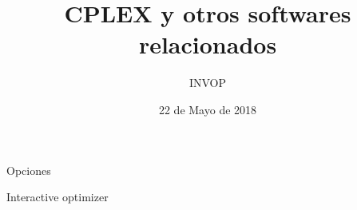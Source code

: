 \documentclass{beamer}
\title{CPLEX y otros softwares relacionados}
\author{INVOP}
\institute{Departamento de Computaci\'on, FCEyN, Universidad de Buenos Aires.}
\date{22 de Mayo de 2018}
\begin{document}
\maketitle




\begin{frame}{Opciones}


\end{frame}




\begin{frame}{Interactive optimizer}




\end{frame}
\end{document}
